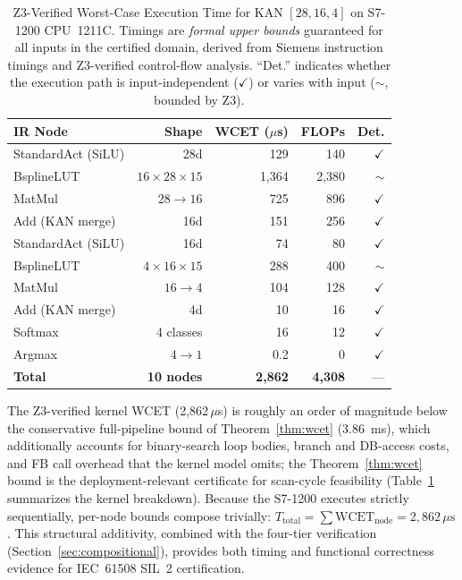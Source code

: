 \documentclass[journal,onecolumn]{IEEEtran}
\begin{document}
\begin{table}[t]
\centering
\caption{Z3-Verified Worst-Case Execution Time for KAN $[28,16,4]$
        on S7-1200 CPU~1211C. Timings are \emph{formal upper bounds}
        guaranteed for all inputs in the certified domain, derived from
        Siemens instruction timings and Z3-verified control-flow analysis.
         ``Det.'' indicates whether the execution path is input-independent
         ($\checkmark$) or varies with input ($\sim$, bounded by Z3).}
\label{tab:wcet}
\small
\begin{tabular}{lrrrr}
\toprule
\textbf{IR Node} & \textbf{Shape} & \textbf{WCET ($\mu$s)} & \textbf{FLOPs} & \textbf{Det.} \\
\midrule
StandardAct (SiLU) & 28d & 129 & 140 & $\checkmark$ \\
BsplineLUT         & $16{\times}28{\times}15$ & 1,364 & 2,380 & $\sim$ \\
MatMul             & $28{\rightarrow}16$ & 725 & 896 & $\checkmark$ \\
Add (KAN merge)    & 16d & 151 & 256 & $\checkmark$ \\
StandardAct (SiLU) & 16d & 74 & 80 & $\checkmark$ \\
BsplineLUT         & $4{\times}16{\times}15$ & 288 & 400 & $\sim$ \\
MatMul             & $16{\rightarrow}4$ & 104 & 128 & $\checkmark$ \\
Add (KAN merge)    & 4d & 10 & 16 & $\checkmark$ \\
Softmax            & 4 classes & 16 & 12 & $\checkmark$ \\
Argmax             & $4{\rightarrow}1$ & 0.2 & 0 & $\checkmark$ \\
\midrule
\textbf{Total} & \textbf{10 nodes} & \textbf{2,862} & \textbf{4,308} & --- \\
\bottomrule
\end{tabular}
\end{table}

The Z3-verified kernel WCET (2,862\,$\mu$s) is roughly an order of
magnitude below the conservative full-pipeline bound of
Theorem~\ref{thm:wcet} (3.86~ms), which additionally accounts for
binary-search loop bodies, branch and DB-access costs, and FB call
overhead that the kernel model omits; the Theorem~\ref{thm:wcet} bound
is the deployment-relevant certificate for scan-cycle feasibility
(Table~\ref{tab:wcet} summarizes the kernel breakdown). Because the S7-1200 executes
strictly sequentially, per-node bounds compose trivially: $T_{\text{total}}
= \sum \text{WCET}_{\text{node}} = 2,862\,\mu\text{s}$. This structural
additivity, combined with the four-tier
verification (Section~\ref{sec:compositional}), provides both timing and
functional correctness evidence for IEC~61508 SIL~2 certification.
\end{document}
